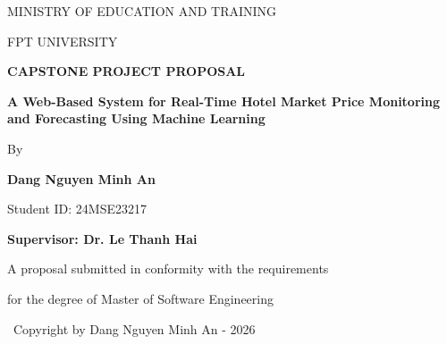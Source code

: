 \documentclass[12pt,a4paper]{report}
\begin{document}
\begin{titlepage}
    \centering
    \vspace*{1cm}

    {\large MINISTRY OF EDUCATION AND TRAINING\par}
    {\large FPT UNIVERSITY\par}
    \vspace{2cm}

    {\Large\bfseries CAPSTONE PROJECT PROPOSAL\par}
    \vspace{1cm}

    {\LARGE\bfseries A Web-Based System for Real-Time Hotel Market Price Monitoring and Forecasting Using Machine Learning\par}
    \vspace{1.5cm}

    {\Large By\par}
    \vspace{0.8cm}

    {\large\bfseries Dang Nguyen Minh An\par}
    {\large Student ID: 24MSE23217\par}
    \vspace{0.8cm}

    {\large\bfseries Supervisor: Dr. Le Thanh Hai\par}
    \vspace{2cm}

    {\large A proposal submitted in conformity with the requirements\par}
    {\large for the degree of Master of Software Engineering\par}
    \vspace{2cm}

    {\large \textcopyright\ Copyright by Dang Nguyen Minh An - 2026\par}

\end{titlepage}



\tableofcontents
\newpage

\listoffigures
{}
\newpage

\listoftables
{}
\newpage










\end{document}
